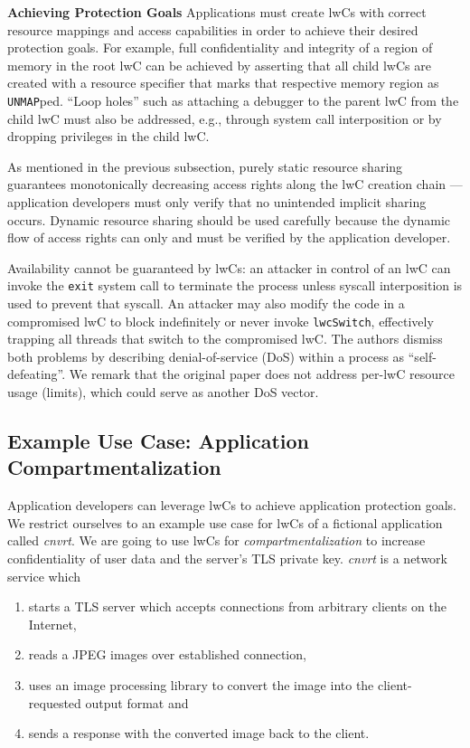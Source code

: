 \documentclass[10pt,twocolumn,a4paper]{article}
\begin{document}
\textbf{Achieving Protection Goals}\hspace{1em}
Applications must create lwCs with correct resource mappings and access capabilities in order to achieve their desired protection goals.
For example, full confidentiality and integrity of a region of memory in the root lwC can be achieved by asserting that all child lwCs are created with a resource specifier that marks that respective memory region as \lstinline{UNMAP}ped.
\enquote{Loop holes} such as attaching a debugger to the parent lwC from the child lwC must also be addressed, e.g., through system call interposition or by dropping privileges in the child lwC.

As mentioned in the previous subsection, purely static resource sharing guarantees monotonically decreasing access rights along the lwC creation chain ---
application developers must only verify that no unintended implicit sharing occurs.
Dynamic resource sharing should be used carefully because the dynamic flow of access rights can only and must be verified by the application developer.
\cite{lwcpaper}

Availability cannot be guaranteed by lwCs:
an attacker in control of an lwC can invoke the \lstinline{exit} system call to terminate the process unless syscall interposition is used to prevent that syscall.
An attacker may also modify the code in a compromised lwC to block indefinitely or never invoke \lstinline{lwcSwitch}, effectively trapping all threads that switch to the compromised lwC.
The authors dismiss both problems by describing denial-of-service (DoS) within a process as \enquote{self-defeating}.
We remark that the original paper does not address per-lwC resource usage (limits), which could serve as another DoS vector. 
\cite{lwcpaper}


\subsection{Example Use Case: Application Compartmentalization}\label{design:usage} %

Application developers can leverage lwCs to achieve application protection goals.
We restrict ourselves to an example use case for lwCs of a fictional application called \newcommand\appname{\textit{cnvrt}\xspace} \appname.
We are going to use lwCs for \textit{compartmentalization} to increase confidentiality of user data and the server's TLS private key. 
\appname is a network service which
\begin{enumerate}[nosep]
  \item starts a TLS server which accepts connections from arbitrary clients on the Internet,
  \item reads a JPEG images over established connection,
  \item uses an image processing library to convert the image into the client-requested output format and
  \item sends a response with the converted image back to the client.
\end{enumerate}
\end{document}
